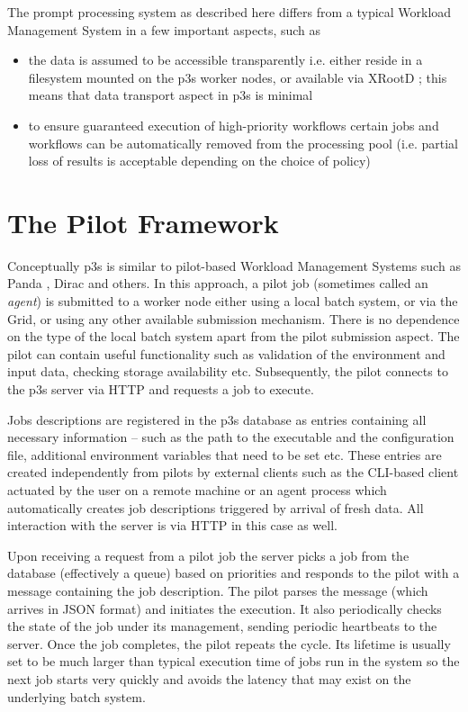 \documentclass{PoS}
\begin{document}
\noindent The prompt processing system as described here differs from a typical Workload Management System in a few important
aspects, such as
\begin{itemize}
\item the data is assumed to be accessible transparently i.e. either reside in a filesystem mounted on the p3s worker nodes,
or available via XRootD \cite{xrootd}; this means that data transport aspect in p3s is minimal

\item to ensure guaranteed execution of high-priority workflows certain jobs and workflows can be automatically
removed from the processing pool (i.e. partial loss of results is acceptable depending on the choice of policy)

\end{itemize}

\section{The Pilot Framework}
Conceptually p3s is similar to pilot-based Workload Management Systems such as Panda \cite{panda}, Dirac \cite{dirac} and others.
In this approach, a pilot job (sometimes called an \textit{agent}) is submitted to a worker node either using a local batch system,
or via the Grid, or using any other available submission mechanism. There is no dependence on the type of the local batch system
apart from the pilot submission aspect. The pilot can contain useful functionality such as validation of the environment and input data,
checking storage availability etc. Subsequently, the pilot connects to the p3s server via HTTP and requests a job to execute.

Jobs descriptions are registered in the p3s database as entries containing all necessary information -- such as the path to the executable
and the configuration file, additional environment variables that need to be set etc. These entries are created independently from pilots by
external clients such as the CLI-based client actuated by the user on a remote machine or an agent process which automatically creates
job descriptions triggered by arrival of fresh data. All interaction with the server is via HTTP in this case as well.

Upon receiving a request from a pilot job the server picks a job from the database (effectively a queue) based on priorities
and responds to the pilot with a message containing the job description. The pilot parses the message (which arrives in JSON
format) and initiates the execution. It also periodically checks the state of the job under its management, sending periodic
heartbeats to the server. Once the job completes, the pilot repeats the cycle. Its lifetime is usually set to be much larger
than typical execution time of jobs run in the system so the next job starts very quickly and avoids the latency
that may exist on the underlying batch system.
\end{document}
